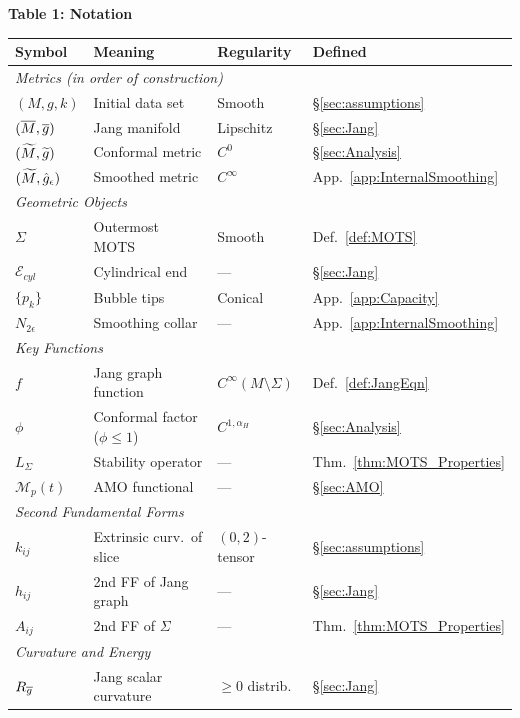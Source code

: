 \begin{center}
\textbf{Table 1: Notation}
\smallskip

\small
\begin{tabular}{p{2.2cm}p{4.8cm}p{2.5cm}p{2cm}}
\toprule
\textbf{Symbol} & \textbf{Meaning} & \textbf{Regularity} & \textbf{Defined} \\
\midrule
\multicolumn{4}{l}{\textit{Metrics (in order of construction)}} \\
$(M, g, k)$ & Initial data set & Smooth & \S\ref{sec:assumptions} \\
$(\overline{M}, \overline{g})$ & Jang manifold & Lipschitz & \S\ref{sec:Jang} \\
$(\widetilde{M}, \widetilde{g})$ & Conformal metric & $C^0$ & \S\ref{sec:Analysis} \\
$(\widetilde{M}, \hat{g}_\epsilon)$ & Smoothed metric & $C^\infty$ & App.~\ref{app:InternalSmoothing} \\
\midrule
\multicolumn{4}{l}{\textit{Geometric Objects}} \\
$\Sigma$ & Outermost MOTS & Smooth & Def.~\ref{def:MOTS} \\
$\mathcal{E}_{cyl}$ & Cylindrical end & --- & \S\ref{sec:Jang} \\
$\{p_k\}$ & Bubble tips & Conical & App.~\ref{app:Capacity} \\
$N_{2\epsilon}$ & Smoothing collar & --- & App.~\ref{app:InternalSmoothing} \\
\midrule
\multicolumn{4}{l}{\textit{Key Functions}} \\
$f$ & Jang graph function & $C^\infty(M \setminus \Sigma)$ & Def.~\ref{def:JangEqn} \\
$\phi$ & Conformal factor ($\phi \le 1$) & $C^{1,\alpha_H}$ & \S\ref{sec:Analysis} \\
$L_\Sigma$ & Stability operator & --- & Thm.~\ref{thm:MOTS_Properties} \\
$\mathcal{M}_p(t)$ & AMO functional & --- & \S\ref{sec:AMO} \\
\midrule
\multicolumn{4}{l}{\textit{Second Fundamental Forms}} \\
$k_{ij}$ & Extrinsic curv.\ of slice & $(0,2)$-tensor & \S\ref{sec:assumptions} \\
$h_{ij}$ & 2nd FF of Jang graph & --- & \S\ref{sec:Jang} \\
$A_{ij}$ & 2nd FF of $\Sigma$ & --- & Thm.~\ref{thm:MOTS_Properties} \\
\midrule
\multicolumn{4}{l}{\textit{Curvature and Energy}} \\
$R_{\overline{g}}$ & Jang scalar curvature & $\ge 0$ distrib. & \S\ref{sec:Jang} \\

\end{tabular}
\end{center}

